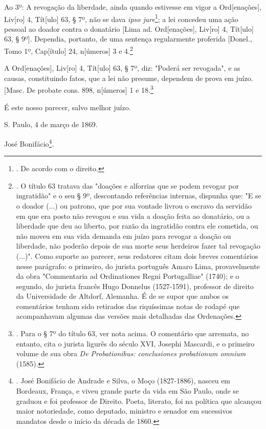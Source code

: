 Ao 3º: A revogação da liberdade, ainda quando estivesse em vigor a
Ord{[}enações{]}, Liv{[}ro{]} 4, Tít{[}ulo{]} 63, § 7º, não se dava
\emph{ipso jure}\footnote{. De acordo com o direito.}; a lei concedeu
uma ação pessoal ao doador contra o donatário {[}Lima ad.
Ord{[}enações{]}, Liv{[}ro{]} 4, Tít{[}ulo{]} 63, § 9º{]}. Dependia,
portanto, de uma sentença regularmente proferida {[}Donel., Tomo 1º,
Cap{[}ítulo{]} 24, n{[}úmeros{]} 3 e 4.\footnote{. O título 63 tratava
  das "doações e alforrias que se podem revogar por ingratidão" e o seu
  § 9º, descontando referências internas, dispunha que: "E se o doador
  (...) ou patrono, que por sua vontade livrou o escravo da servidão em
  que era posto não revogou e sua vida a doação feita ao donatário, ou a
  liberdade que deu ao liberto, por razão da ingratidão contra ele
  cometida, ou não moveu em sua vida demanda em juízo para revogar a
  doação ou liberdade, não poderão depois de sua morte seus herdeiros
  fazer tal revogação (...)". Como suporte ao parecer, seus redatores
  citam dois breves comentários nesse parágrafo: o primeiro, do jurista
  português Amaro Lima, provavelmente da obra "Commentaria ad
  Ordinationes Regni Portugalliae" (1740); e o segundo, do jurista
  francês Hugo Donnelus (1527-1591), professor de direito da
  Universidade de Altdorf, Alemanha. É de se supor que ambos os
  comentários tenham sido retirados das riquíssimas notas de rodapé que
  acompanhavam algumas das versões mais detalhadas das Ordenações.}

A Ord{[}enações{]}, Liv{[}ro{]} 4, Tít{[}ulo{]} 63, § 7º, diz: "Poderá
ser revogada", e as causas, constituindo fatos, que a lei não presume,
dependem de prova em juízo. {[}Masc. De probate cons. 898, n{[}úmeros{]}
1 e 18.\footnote{. Para o § 7º do título 63, ver nota acima. O
  comentário que arremata, no entanto, cita o jurista ligurês do século
  XVI, Josephi Mascardi, e o primeiro volume de sua obra \emph{De
  Probationibus: conclusiones probationum omnium} (1585).}

É este nosso parecer, salvo melhor juízo.

S. Paulo, 4 de março de 1869.

José Bonifácio\footnote{. José Bonifácio de Andrade e Silva, o Moço
  (1827-1886), nasceu em Bordeaux, França, e viveu grande parte da vida
  em São Paulo, onde se graduou e foi professor de Direito. Poeta,
  literato, foi na política que alcançou maior notoriedade, como
  deputado, ministro e senador em sucessivos mandatos desde o início da
  década de 1860.}.

